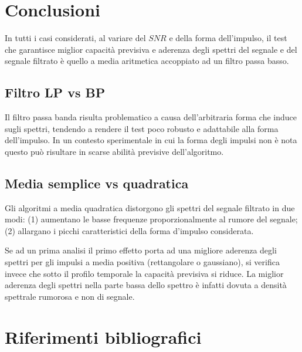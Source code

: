 \documentclass[9pt,twocolumn,twoside]{osajnl}
\begin{document}
\section{Conclusioni}
\label{conclusioni}

In tutti i casi considerati, al variare del $SNR$ e della forma dell'impulso, il test che garantisce miglior capacità previsiva e aderenza degli spettri del segnale e del segnale filtrato è quello a media aritmetica accoppiato ad un filtro passa basso.

\subsection{Filtro LP vs BP}
Il filtro passa banda risulta problematico a causa dell'arbitraria forma che induce sugli spettri, tendendo a rendere il test poco robusto e adattabile alla forma dell'impulso. In un contesto sperimentale in cui la forma degli impulsi non è nota questo può risultare in scarse abilità previsive dell'algoritmo.

\subsection{Media semplice vs quadratica}
Gli algoritmi a media quadratica distorgono gli spettri del segnale filtrato in due modi: (1) aumentano le basse frequenze proporzionalmente al rumore del segnale; (2) allargano i picchi caratteristici della forma d'impulso considerata.

Se ad un prima analisi il primo effetto porta ad una migliore aderenza degli spettri per gli impulsi a media positiva (rettangolare o gaussiano), si verifica invece che sotto il profilo temporale la capacità previsiva si riduce. La miglior aderenza degli spettri nella parte bassa dello spettro è infatti dovuta a densità spettrale rumorosa e non di segnale.


\section{Riferimenti bibliografici}





\end{document}

